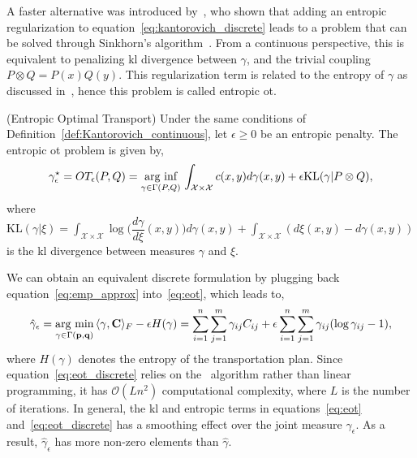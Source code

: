 A faster alternative was introduced by~\cite{cuturi2013sinkhorn}, who shown that adding an entropic regularization to equation~\ref{eq:kantorovich_discrete} leads to a problem that can be solved through Sinkhorn's algorithm~\cite{sinkhorn1967diagonal}. From a continuous perspective, this is equivalent to penalizing \gls{kl} divergence between $\gamma$, and the trivial coupling $P \otimes Q = P(x)Q(y)$. This regularization term is related to the entropy of $\gamma$ as discussed in~\cite[Chapter 4]{peyre2020computationaloptimaltransport}, hence this problem is called entropic \gls{ot}.
\begin{definition}{(Entropic Optimal Transport)}\label{def:entropic_ot}
    Under the same conditions of Definition~\ref{def:Kantorovich_continuous}, let $\epsilon \geq 0$ be an entropic penalty. The entropic \gls{ot} problem is given by,
    \begin{align}
        \gamma^{\star}_{\epsilon} = OT_{\epsilon}(P, Q) = \underset{\gamma \in \Gamma(P, Q)}{\text{arg inf}}\, \int_{\mathcal{X}\times\mathcal{X}}c(x,y)d\gamma(x,y) + \epsilon \text{KL}(\gamma|P\otimes Q),\label{eq:eot}
    \end{align}
    where $\text{KL}(\gamma|\xi) = \int_{\mathcal{X} \times \mathcal{X}}\log\biggr(\dfrac{d\gamma}{d\xi}(x,y)\biggr)d\gamma(x,y) + \int_{\mathcal{X}\times\mathcal{X}}(d\xi(x,y) - d\gamma(x,y))$ is the \gls{kl} divergence between measures $\gamma$ and $\xi$.
\end{definition}

We can obtain an equivalent discrete formulation by plugging back equation~\ref{eq:emp_approx} into~\ref{eq:eot}, which leads to,
\begin{align}
    \hat{\gamma}_{\epsilon} = \underset{\gamma \in \Gamma(\mathbf{p},\mathbf{q})}{\text{arg min}}\,\langle \gamma, \mathbf{C} \rangle_{F} - \epsilon H(\gamma) = \sum_{i=1}^{n}\sum_{j=1}^{m}\gamma_{ij}C_{ij} + \epsilon\sum_{i=1}^{n}\sum_{j=1}^{m}\gamma_{ij}(\log \gamma_{ij} - 1),\label{eq:eot_discrete}
\end{align}
where $H(\gamma)$ denotes the entropy of the transportation plan. Since equation~\ref{eq:eot_discrete} relies on the~\cite{sinkhorn1967diagonal} algorithm rather than linear programming, it has $\mathcal{O}(Ln^{2})$ computational complexity, where $L$ is the number of iterations. In general, the \gls{kl} and entropic terms in equations~\ref{eq:eot} and~\ref{eq:eot_discrete} has a smoothing effect over the joint measure $\gamma_{\epsilon}$. As a result, $\hat{\gamma}_{\epsilon}$ has more non-zero elements than $\hat{\gamma}$.


